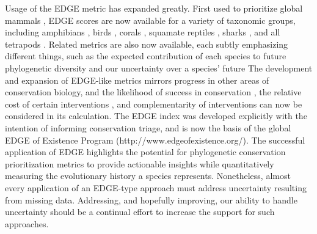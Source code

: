 \documentclass[10pt,english]{article}
\begin{document}
Usage of the EDGE metric has expanded greatly. First used to prioritize global
mammals \autocite{Isaac2007}, EDGE scores are now available for a variety of
taxonomic groups, including amphibians \autocite{Isaac2012}, birds
\autocite{Jetz2014}, corals \autocite{Curnick2015}, squamate reptiles
\autocite{Tonini2016}, sharks \autocite{Stein2018}, and all tetrapods
\autocite{Gumbs2018}. Related metrics are also now available, each subtly
emphasizing different things, such as the expected contribution of each species
to future phylogenetic diversity \autocite[HEDGE,
I-HEDGE;][]{Steel2007,Jensen2016} and our uncertainty over a species' future
\autocite[EDAM;][]{Pearse2015} The development and expansion of EDGE-like
metrics mirrors progress in other areas of conservation biology, and the
likelihood of success in conservation \autocite{Wilson2007, Mcbride2007}, the
relative cost of certain interventions \autocite{Naidoo2006}, and
complementarity of interventions \autocite{Pressey1993, Myers2000} can now be
considered in its calculation. The EDGE index was developed explicitly with the
intention of informing conservation triage, and is now the basis of the global
EDGE of Existence Program (http://www.edgeofexistence.org/). The successful
application of EDGE highlights the potential for phylogenetic conservation
prioritization metrics to provide actionable insights while quantitatively
measuring the evolutionary history a species represents. Nonetheless, almost
every application of an EDGE-type approach must address uncertainty resulting
from missing data. Addressing, and hopefully improving, our ability to
handle uncertainty should be a continual effort to increase the support for such
approaches. 
\end{document}
